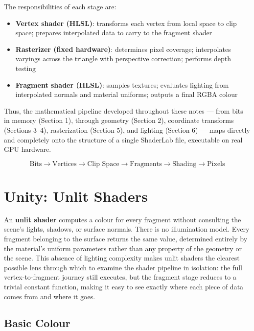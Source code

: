 \documentclass[11pt]{article}
\begin{document}
The responsibilities of each stage are:

\begin{itemize}
    \item \textbf{Vertex shader (HLSL)}: transforms each vertex from local space to clip space; prepares interpolated data to carry to the fragment shader
    \item \textbf{Rasterizer (fixed hardware)}: determines pixel coverage; interpolates varyings across the triangle with perspective correction; performs depth testing
    \item \textbf{Fragment shader (HLSL)}: samples textures; evaluates lighting from interpolated normals and material uniforms; outputs a final RGBA colour
\end{itemize}

Thus, the mathematical pipeline developed throughout these notes --- from bits in memory (Section 1), through geometry (Section 2), coordinate transforms (Sections 3--4), rasterization (Section 5), and lighting (Section 6) --- maps directly and completely onto the structure of a single ShaderLab file, executable on real GPU hardware.

\begin{equation}
    \text{Bits} \rightarrow \text{Vertices} \rightarrow \text{Clip Space} \rightarrow \text{Fragments} \rightarrow \text{Shading} \rightarrow \text{Pixels}
\end{equation}


\section{Unity: Unlit Shaders}

An \textbf{unlit shader} computes a colour for every fragment without consulting the scene's lights, shadows, or surface normals. There is no illumination model. Every fragment belonging to the surface returns the same value, determined entirely by the material's uniform parameters rather than any property of the geometry or the scene. This absence of lighting complexity makes unlit shaders the clearest possible lens through which to examine the shader pipeline in isolation: the full vertex-to-fragment journey still executes, but the fragment stage reduces to a trivial constant function, making it easy to see exactly where each piece of data comes from and where it goes.

\subsection{Basic Colour}
\end{document}
